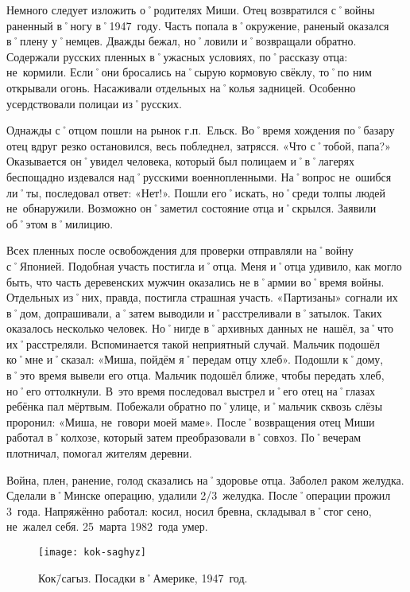 Немного следует изложить о˚родителях Миши. Отец возвратился с˚войны раненный в˚ногу в˚1947~году. Часть попала в˚окружение, раненый оказался в˚плену у˚немцев. Дважды бежал, но˚ловили и˚возвращали обратно. Содержали русских пленных в˚ужасных условиях, по˚рассказу отца: не~кормили. Если˚они бросались на˚сырую кормовую свёклу, то˚по ним открывали огонь. Насаживали отдельных на˚колья задницей. Особенно усердствовали полицаи из˚русских. 

Однажды с˚отцом пошли на рынок г.п.~Ельск. Во˚время хождения по˚базару отец вдруг резко остановился, весь побледнел, затрясся. «Что с˚тобой, папа?» Оказывается он˚увидел человека, который был полицаем и˚в˚лагерях беспощадно издевался над˚русскими военнопленными. На˚вопрос не~ошибся ли˚ты, последовал ответ: «Нет!». Пошли его˚искать, но˚среди толпы людей не~обнаружили. Возможно он˚заметил состояние отца и˚скрылся. Заявили об˚этом в˚милицию.

Всех пленных после освобождения для проверки отправляли на˚войну с˚Японией. Подобная участь постигла и˚отца. Меня и˚отца удивило, как могло быть, что часть деревенских мужчин оказались не в˚армии во˚время войны. Отдельных из˚них, правда, постигла страшная участь. «Партизаны» согнали их в˚дом, допрашивали, а˚затем выводили и˚расстреливали в˚затылок. Таких оказалось несколько человек. Но˚нигде в˚архивных данных не~нашёл, за˚что их˚расстреляли. Вспоминается такой неприятный случай. Мальчик подошёл ко˚мне и˚сказал: «Миша, пойдём я˚передам отцу хлеб». Подошли к˚дому, в˚это время вывели его отца. Мальчик подошёл ближе, чтобы передать хлеб, но˚его оттолкнули. В~это время последовал выстрел и˚его отец на˚глазах ребёнка пал мёртвым. Побежали обратно по˚улице, и˚мальчик сквозь слёзы проронил: «Миша, не~говори моей маме». 
После˚возвращения отец Миши работал в˚колхозе, который затем преобразовали в˚совхоз. По˚вечерам плотничал, помогал жителям деревни.

Война, плен, ранение, голод сказались на˚здоровье отца. Заболел раком желудка. Сделали в˚Минске операцию, удалили 2/3~желудка. После˚операции прожил 3~года. Напряжённо работал: косил, носил бревна, складывал в˚стог сено, не~жалел себя. 25~марта 1982~года умер.

\begin{wrapfigure}{O}{.4\textwidth}
\centering
\texttt{[image: kok-saghyz]}
\caption[Кок\=/сагыз. Посадки в˚Америке, 1947~год.]{Кок\=/сагыз. Посадки в˚Америке, 1947~год\footnotemark.}
\label{fig:kok-saghyz}
\end{wrapfigure}

